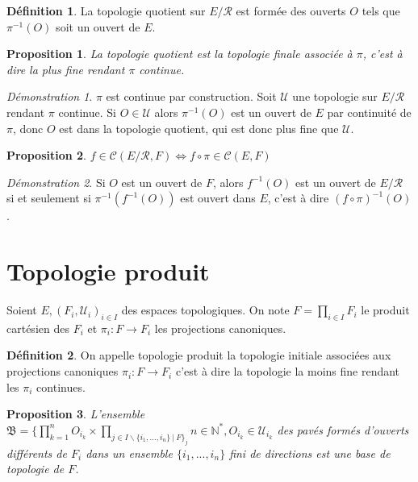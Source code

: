 \documentclass[a4paper, 11pt, french]{book}
\theoremstyle{plain} %
\newtheorem{proposition}{Proposition}
\theoremstyle{definition} %
\newtheorem{definition}{Définition}
\theoremstyle{remark} %
\newtheorem*{demonstration}{Démonstration}
\renewcommand{\setminus}{\backslash}
\newcommand{\1}{\mathds{1}}
\newcommand{\cont}{\mathcal{C}}
\newcommand{\inv}[1]{#1^{-1}}
\newcommand{\N}{\mathbb{N}}
\newcommand\ens[2]{\{#1 \ |\ #2\}}
\begin{document}
\begin{definition}
	La topologie quotient sur $E/\mathcal{R}$ est formée des ouverts $O$ tels que $\inv{\pi}(O)$ soit un ouvert de $E$.
\end{definition}

\begin{proposition}
	La topologie quotient est la topologie finale associée à $\pi$, c'est à dire la plus fine rendant $\pi$ continue.
\end{proposition}

\begin{demonstration}
	$\pi$ est continue par construction.
	Soit $\mathscr{U}$ une topologie sur $E/\mathcal{R}$ rendant $\pi$ continue.
	Si $O\in\mathscr{U}$ alors $\inv{\pi}(O)$ est un ouvert de $E$ par continuité de $\pi$, donc $O$ est dans la topologie quotient, qui est donc plus fine que $\mathscr{U}$.
\end{demonstration}

\begin{proposition}
	$f\in\cont(E/\mathcal{R}, F)\iff f\circ\pi\in\cont(E, F)$
\end{proposition}

\begin{demonstration}
	Si $O$ est un ouvert de $F$, alors $\inv{f}(O)$ est un ouvert de $E/\mathcal{R}$ si et seulement si $\inv{\pi}(\inv{f}(O))$ est ouvert dans $E$, c'est à dire $\inv{(f\circ\pi)}(O)$.
\end{demonstration}

\section{Topologie produit}

Soient $E, (F_i, \mathscr{U}_i)_{i\in I}$ des espaces topologiques.
On note $F=\prod_{i\in I} F_i$ le produit cartésien des $F_i$ et $\pi_i\colon F\rightarrow F_i$ les projections canoniques.

\begin{definition}
	On appelle topologie produit la topologie initiale associées aux projections canoniques $\pi_i\colon F\rightarrow F_i$ c'est à dire la topologie la moins fine rendant les $\pi_i$ continues.
\end{definition}

\begin{proposition}
	L'ensemble $\mathfrak{B}=\{\prod_{k=1}^nO_{i_k}\times\prod_{j\in I\setminus\ens{i_1, ..., i_n\}}F_j}{n\in\N^*, O_{i_k}\in\mathscr{U}_{i_k}}$ des pavés formés d'ouverts différents de $F_i$ dans un ensemble $\{i_1,...,i_n\}$ fini de directions est une base de topologie de $F$.
\end{proposition}
\end{document}

